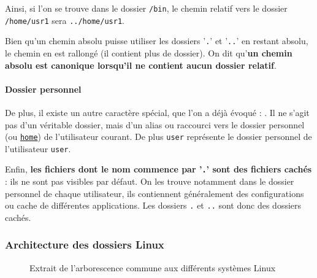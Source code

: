 Ainsi, si l'on se trouve dans le dossier \texttt{/bin}, le chemin relatif vers le dossier \texttt{/home/usr1} sera \texttt{../home/usr1}.

 Bien qu'un chemin absolu puisse utiliser les dossiers '\texttt{.}' et '\texttt{..}' en restant absolu, le chemin en est rallongé (il contient plus de dossier). On dit qu'\textbf{un chemin absolu est canonique lorsqu'il ne contient aucun dossier relatif}.

\paragraph{Dossier personnel}

De plus, il existe un autre caractère spécial, que l'on a déjà évoqué : \texttt{\tilde}. Il ne s'agit pas d'un véritable dossier, mais d'un alias ou raccourci vers le dossier personnel (ou \hyperref[sec:dirhome]{\texttt{home}}) de l'utilisateur courant. De plus \texttt{\tilde user} représente le dossier personnel de l'utilisateur \texttt{user}.

Enfin, \textbf{les fichiers dont le nom commence par '\texttt{.}' sont des fichiers cachés} : ils ne sont pas visibles par défaut. On les trouve notamment dans le dossier personnel de chaque utilisateur, ils contiennent généralement des configurations ou cache de différentes applications. Les dossiers \texttt{.} et \texttt{..} sont donc des dossiers cachés.

\newpage
\subsubsection{Architecture des dossiers Linux}

\begin{figure}[hb!]
    \centering
{}
    \caption{Extrait de l'arborescence commune aux différents systèmes Linux}
    \label{fig:linux_tree}
\end{figure}


